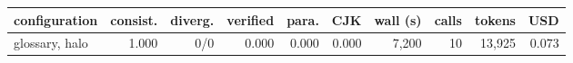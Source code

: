 \begin{tabular}{lrrrrrrrrr}
\toprule
configuration & consist. & diverg. & verified & para. & CJK & wall (s) & calls & tokens & USD \\
\midrule
glossary, halo & 1.000 & 0/0 & 0.000 & 0.000 & 0.000 & 7,200 & 10 & 13,925 & 0.073 \\
\bottomrule
\end{tabular}
